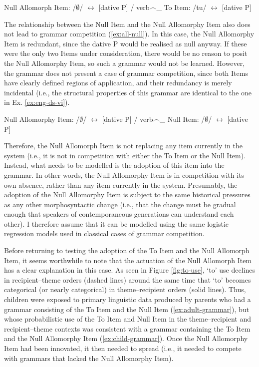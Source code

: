 	\begin{exe}
		\begin{xlist}
			\ex Null Allomorph Item: /$\emptyset$/ $\leftrightarrow$ [dative P] / verb$\smallfrown$\_
			\ex To Item: /tu/ $\leftrightarrow$ [dative P]
		\end{xlist}
	\end{exe}

	The relationship between the Null Item and the Null Allomorphy Item also does not lead to grammar competition (\ref{ex:all-null}). In this case, the Null Allomorphy Item is redundant, since the dative P would be realised as null anyway. If these were the only two Items under consideration, there would be no reason to posit the Null Allomorphy Item, so such a grammar would not be learned. However, the grammar does not present a case of grammar competition, since both Items have clearly defined regions of application, and their redundancy is merely incidental (i.e., the structural properties of this grammar are identical to the one in Ex. \ref{ex:eng-ds-vi}).

	\begin{exe}
		\ex \label{ex:all-null} 
			\begin{xlist}
				\ex Null Allomorphy Item: /$\emptyset$/ $\leftrightarrow$ [dative P] / verb$\smallfrown$\_
				\ex Null Item:  /$\emptyset$/ $\leftrightarrow$ [dative P]
			\end{xlist}
	\end{exe}

	Therefore, the Null Allomorph Item is not replacing any item currently in the system (i.e., it is not in competition with either the To Item or the Null Item). Instead, what needs to be modelled is the adoption of this item into the grammar. In other words, the Null Allomorphy Item is in competition with its own absence, rather than any item currently in the system. Presumably, the adoption of the Null Allomorphy Item is subject to the same historical pressures as any other morphosyntactic change (i.e., that the change must be gradual enough that speakers of contemporaneous generations can understand each other). I therefore assume that it can be modelled using the same logistic regression models used in classical cases of grammar competition.

	Before returning to testing the adoption of the To Item and the Null Allomorph Item, it seems worthwhile to note that the actuation of the Null Allomorph Item has a clear explanation in this case. As seen in Figure \ref{fig:to-use}, `to' use declines in recipient--theme orders (dashed lines) around the same time that `to' becomes categorical (or nearly categorical) in theme--recipient orders (solid lines). Thus, children were exposed to primary linguistic data produced by parents who had a grammar consisting of the To Item and the Null Item (\ref{ex:adult-grammar}), but whose probabilistic use of the To Item and Null Item in the theme--recipient and recipient--theme contexts was consistent with a grammar containing the To Item and the Null Allomorphy Item (\ref{ex:child-grammar}). Once the Null Allomorphy Item had been innovated, it then needed to spread (i.e., it needed to compete with grammars that lacked the Null Allomorphy Item).

